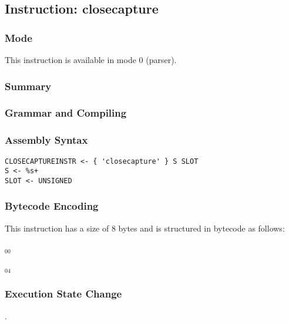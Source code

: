 \subsection{Instruction: closecapture}

\subsubsection{Mode}
This instruction is available in mode 0 (parser).
\subsubsection{Summary}


\subsubsection{Grammar and Compiling}


\subsubsection{Assembly Syntax}

\begin{myquote}
\begin{verbatim}
CLOSECAPTUREINSTR <- { 'closecapture' } S SLOT
S <- %s+
SLOT <- UNSIGNED
\end{verbatim}
\end{myquote}

\subsubsection{Bytecode Encoding}

This instruction has a size of 8 bytes and is structured in bytecode as follows:

$_{00}$\ 



$_{04}$\ 


\subsubsection{Execution State Change}

.


